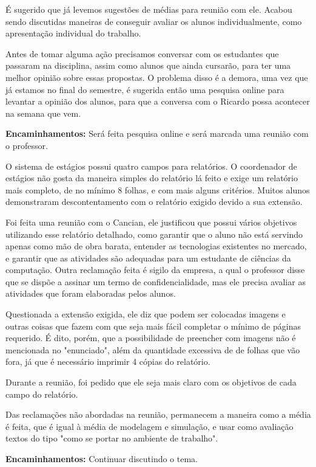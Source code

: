 \documentclass{ata-calico}
\begin{document}
É sugerido que já levemos sugestões de médias para reunião com ele. Acabou sendo discutidas maneiras de conseguir avaliar os alunos individualmente, como apresentação individual do trabalho.

Antes de tomar alguma ação precisamos conversar com os estudantes que passaram na  disciplina, assim como alunos que ainda cursarão, para ter uma melhor opinião sobre essas propostas. O problema disso é a demora, uma vez que já estamos no final do semestre, é sugerida então uma pesquisa online para levantar a opinião dos alunos, para que a conversa com o Ricardo possa acontecer na semana que vem.
\newline

\textbf{Encaminhamentos:} Será feita pesquisa online e será marcada uma reunião com o professor.

O sistema de estágios possui quatro campos para relatórios. O coordenador de estágios não gosta da maneira simples do relatório lá feito e exige um relatório mais completo, de no mínimo 8 folhas, e com mais alguns critérios. Muitos alunos demonstraram descontentamento com o relatório exigido devido a sua extensão.

Foi feita uma reunião com o Cancian, ele justificou que possui vários objetivos utilizando esse relatório detalhado, como garantir que o aluno não está servindo apenas como mão de obra barata, entender as tecnologias existentes no mercado, e garantir que as atividades são adequadas para um estudante de ciências da computação. Outra reclamação feita é sigilo da empresa, a qual o professor disse que se dispõe a assinar um termo de confidencialidade, mas ele precisa avaliar as atividades que foram elaboradas pelos alunos.

Questionada a extensão exigida, ele diz que podem ser colocadas imagens e outras coisas que fazem com que seja mais fácil completar o mínimo de páginas requerido. É dito, porém, que a possibilidade de preencher com imagens não é mencionada no "enunciado", além da quantidade excessiva de de folhas que vão fora, já que é necessário imprimir 4 cópias do relatório.

Durante a reunião, foi pedido que ele seja mais claro com os objetivos de cada campo do relatório.

Das reclamações não abordadas na reunião, permanecem a maneira como a média é feita, que é igual à média de modelagem e simulação, e usar como avaliação textos do tipo "como se portar no ambiente de trabalho".
\newline

\textbf{Encaminhamentos:} Continuar discutindo o tema.

\end{document}
